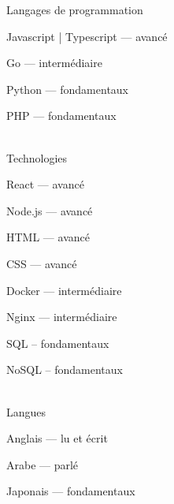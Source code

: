 

\begin{cvskills}

  \cvskill
    {Langages de programmation} %
    {
      \begin{cvitems} %
        \item {Javascript | Typescript — avancé}
        \item {Go — intermédiaire}
        \item {Python — fondamentaux}
        \item {PHP — fondamentaux}
      \end{cvitems}
    }
\\

  \cvskill
    {Technologies} %
    {
      \begin{cvitems} %
        \item {React — avancé}
        \item {Node.js — avancé}
        \item {HTML — avancé}
        \item {CSS — avancé}
        \item {Docker — intermédiaire}
        \item {Nginx — intermédiaire}
        \item {SQL – fondamentaux}
        \item {NoSQL – fondamentaux}
      \end{cvitems}
    }
\\

  \cvskill
    {Langues} %
    {
      \begin{cvitems} %
        \item {Anglais — lu et écrit}
        \item {Arabe — parlé}
        \item {Japonais — fondamentaux}
      \end{cvitems}
    }

\end{cvskills}
